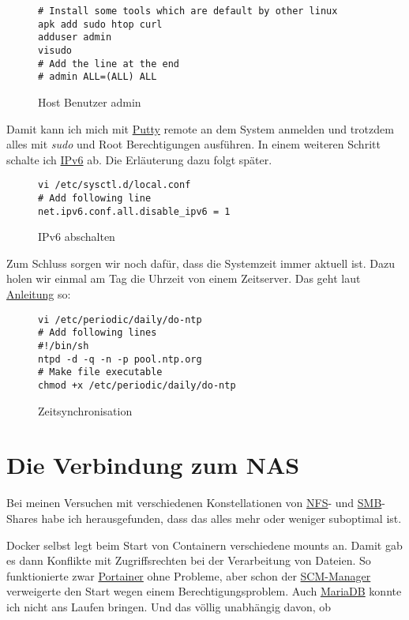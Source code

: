 \documentclass[12pt,a4paper,ngerman]{article}
\newcommand{\code}[1]{\textit{#1}}
\newcommand{\jpacaption}[1]{\caption{#1}\label{fig:#1}}
\begin{document}
\begin{figure}[H]
    \begin{lstlisting}
# Install some tools which are default by other linux
apk add sudo htop curl
adduser admin
visudo
# Add the line at the end
# admin ALL=(ALL) ALL
    \end{lstlisting}
    \jpacaption{Host Benutzer admin}
\end{figure}

Damit kann ich mich mit
\href{https://www.chiark.greenend.org.uk/~sgtatham/putty/latest.html}{Putty}
remote an dem System anmelden und trotzdem alles mit \code{sudo} und Root
Berechtigungen ausführen. In einem weiteren Schritt schalte ich
\href{https://de.wikipedia.org/wiki/IPv6}{IPv6} ab. Die Erläuterung dazu folgt
später.

\begin{figure}[H]
    \begin{lstlisting}
vi /etc/sysctl.d/local.conf
# Add following line
net.ipv6.conf.all.disable_ipv6 = 1
    \end{lstlisting}
    \jpacaption{IPv6 abschalten}
\end{figure}

Zum Schluss sorgen wir noch dafür, dass die Systemzeit immer aktuell ist. Dazu
holen wir einmal am Tag die Uhrzeit von einem Zeitserver. Das geht laut
\href{https://wiki.alpinelinux.org/wiki/Alpine_Linux:FAQ#OpenNTPD_reports_an_error_with_.22adjtime.22}{Anleitung}
so:

\begin{figure}[H]
    \begin{lstlisting}
vi /etc/periodic/daily/do-ntp
# Add following lines
#!/bin/sh
ntpd -d -q -n -p pool.ntp.org
# Make file executable
chmod +x /etc/periodic/daily/do-ntp
    \end{lstlisting}
    \jpacaption{Zeitsynchronisation}
\end{figure}

\section{Die Verbindung zum NAS}
Bei meinen Versuchen mit verschiedenen Konstellationen von
\href{https://de.wikipedia.org/wiki/Network_File_System}{NFS}- und
\href{https://de.wikipedia.org/wiki/Server_Message_Block}{SMB}-Shares habe ich
herausgefunden, dass das alles mehr oder weniger suboptimal ist.

Docker selbst legt beim Start von Containern verschiedene mounts an. Damit gab
es dann Konflikte mit Zugriffsrechten bei der Verarbeitung von Dateien. So
funktionierte zwar
\href{https://hub.docker.com/r/portainer/portainer/}{Portainer} ohne Probleme,
aber schon der
\href{https://hub.docker.com/r/sdorra/scm-manager}{SCM-Manager}
verweigerte den Start wegen einem Berechtigungsproblem. Auch
\href{https://hub.docker.com/r/yobasystems/alpine-mariadb}{MariaDB}
konnte ich nicht ans Laufen bringen. Und das völlig unabhängig davon, ob
\end{document}
